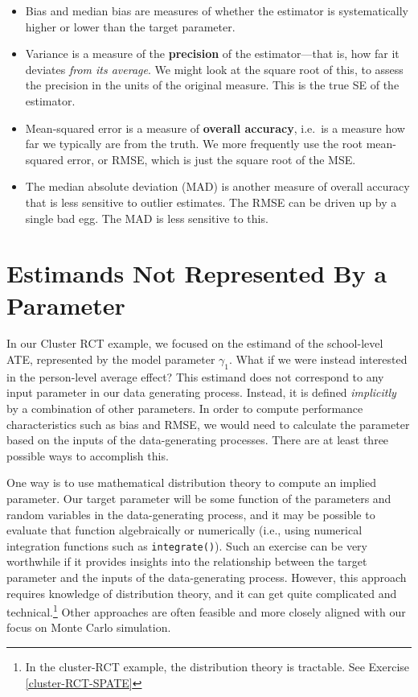 \documentclass[
]{book}
\providecommand{\tightlist}{%
  \setlength{\itemsep}{0pt}\setlength{\parskip}{0pt}}
\begin{document}
\begin{itemize}
\tightlist
\item
  Bias and median bias are measures of whether the estimator is systematically higher or lower than the target parameter.
\item
  Variance is a measure of the \textbf{precision} of the estimator---that is, how far it deviates \emph{from its average}. We might look at the square root of this, to assess the precision in the units of the original measure. This is the true SE of the estimator.
\item
  Mean-squared error is a measure of \textbf{overall accuracy}, i.e.~is a measure how far we typically are from the truth. We more frequently use the root mean-squared error, or RMSE, which is just the square root of the MSE.
\item
  The median absolute deviation (MAD) is another measure of overall accuracy that is less sensitive to outlier estimates. The RMSE can be driven up by a single bad egg. The MAD is less sensitive to this.
\end{itemize}

\section{Estimands Not Represented By a Parameter}\label{implicit-estimands}

In our Cluster RCT example, we focused on the estimand of the school-level ATE, represented by the model parameter \(\gamma_1\).
What if we were instead interested in the person-level average effect?
This estimand does not correspond to any input parameter in our data generating process.
Instead, it is defined \emph{implicitly} by a combination of other parameters.
In order to compute performance characteristics such as bias and RMSE, we would need to calculate the parameter based on the inputs of the data-generating processes.
There are at least three possible ways to accomplish this.

One way is to use mathematical distribution theory to compute an implied parameter.
Our target parameter will be some function of the parameters and random variables in the data-generating process, and it may be possible to evaluate that function algebraically or numerically (i.e., using numerical integration functions such as \texttt{integrate()}).
Such an exercise can be very worthwhile if it provides insights into the relationship between the target parameter and the inputs of the data-generating process.
However, this approach requires knowledge of distribution theory, and it can get quite complicated and technical.\footnote{In the cluster-RCT example, the distribution theory is tractable. See Exercise \ref{cluster-RCT-SPATE}}
Other approaches are often feasible and more closely aligned with our focus on Monte Carlo simulation.
\end{document}
